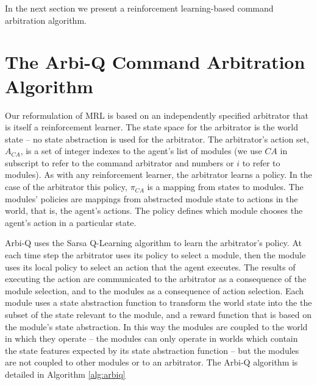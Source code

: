 In the next section we present a reinforcement learning-based command arbitration algorithm.

\section{The Arbi-Q Command Arbitration Algorithm}\label{sec:mrl-arbiq}

Our reformulation of MRL is based on an independently specified arbitrator \cite{brooks1986a-robust} that is itself a reinforcement learner. The state space for the arbitrator is the world state -- no state abstraction is used for the arbitrator. The arbitrator's action set, $A_{CA}$, is a set of integer indexes to the agent's list of modules (we use $CA$ in subscript to refer to the command arbitrator and numbers or $i$ to refer to modules).  As with any reinforcement learner, the arbitrator learns a policy. In the case of the arbitrator this policy, $\pi_{CA}$ is a mapping from states to modules. The modules' policies are mappings from abstracted module state to actions in the world, that is, the agent's actions. The policy defines which module chooses the agent's action in a particular state.

Arbi-Q uses the Sarsa Q-Learning algorithm to learn the arbitrator's policy. At each time step the arbitrator uses its policy to select a module, then the module uses its local policy to select an action that the agent executes. The results of executing the action are communicated to the arbitrator as a consequence of the module selection, and to the modules as a consequence of action selection. Each module uses a state abstraction function to transform the world state into the the subset of the state relevant to the module, and a reward function that is based on the module's state abstraction. In this way the modules are coupled to the world in which they operate -- the modules can only operate in worlds which contain the state features expected by its state abstraction function -- but the modules are not coupled to other modules or to an arbitrator. The Arbi-Q algorithm is detailed in Algorithm \ref{alg:arbiq}


